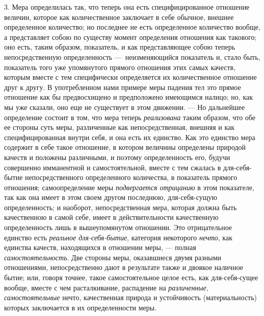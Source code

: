 3. Мера определилась так, что теперь она есть специфицированное отношение
величин, которое как количественное заключает в себе обычное, внешнее
определенное количество; но последнее не есть определенное количество
вообще, а представляет собою по существу момент определения отношения как
такового; оно есть, таким образом, показатель, и как представляющее собою
теперь непосредственную определенность —~неизменяющийся показатель и, стало
быть, показатель того уже упомянутого прямого отношения этих самых качеств,
которым вместе с тем специфически определяется их количественное отношение
друг к другу. В употребленном нами примере меры падения тел это прямое
отношение как бы предвосхищено и предположено имеющимся налицо; но, как мы
уже сказали, оно еще не существует в этом движении. — Но дальнейшее
определение состоит в том, что мера теперь
{\em реализована} таким образом, что обе ее стороны
суть меры, различенные как непосредственная, внешняя и как
специфицированная внутри себя, и она есть их единство. Как это единство
мера содержит в себе такое отношение, в котором величины определены природой 
качеств и положены различными, и поэтому определенность его,
будучи совершенно имманентной и самостоятельной, вместе с тем сжалась в
для-себя-бытие непосредственного определенного количества, в показатель
прямого отношения; самоопределение меры
{\em подвергается отрицанию} в этом показателе, так как
она имеет в этом своем другом последнюю, для-себя-сущую определенность; и
наоборот, непосредственная мера, которая должна быть качественною в самой
себе, имеет в действительности качественную определенность лишь в
вышеупомянутом отношении. Это отрицательное единство есть
{\em реальное для-себя-бытие}, категория некоторого
{\em нечто}, как единства качеств, находящихся в
отношении меры, — полная {\em самостоятельность}. Две
стороны меры, оказавшиеся двумя разными отношениями, непосредственно дают в
результате также и двоякое наличное бытие; или, говоря точнее, такое
самостоятельное целое есть, как для-себя-сущее вообще, вместе с чем
расталкивание, распадение на {\em различенные},
{\em самостоятельные} нечто, качественная природа и
устойчивость (материальность) которых заключается в их определенности меры.

